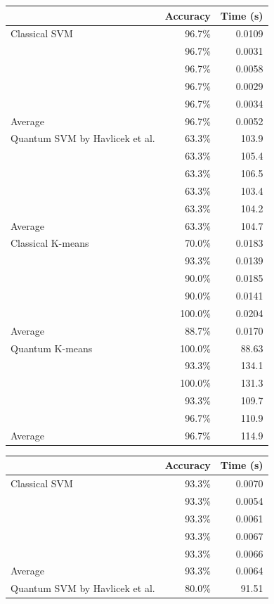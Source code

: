 \documentclass[twocolumn, english]{revtex4-2}
\begin{document}
\begin{table}
\begin{tabular}{l|r|r}
&Accuracy&Time (s)\\
\hline
Classical SVM&96.7\%&0.0109\\
\cline{2-3}
&96.7\%&0.0031\\
\cline{2-3}
&96.7\%&0.0058\\
\cline{2-3}
&96.7\%&0.0029\\
\cline{2-3}
&96.7\%&0.0034\\
\hline\hline
Average&96.7\%&0.0052\\
\hline\hline
Quantum SVM by Havlicek et al.&63.3\%&103.9\\
\cline{2-3}
&63.3\%&105.4\\
\cline{2-3}
&63.3\%&106.5\\
\cline{2-3}
&63.3\%&103.4\\
\cline{2-3}
&63.3\%&104.2\\
\hline\hline
Average&63.3\%&104.7\\
\hline\hline
Classical K-means&70.0\%&0.0183\\
\cline{2-3}
&93.3\%&0.0139\\
\cline{2-3}
&90.0\%&0.0185\\
\cline{2-3}
&90.0\%&0.0141\\
\cline{2-3}
&100.0\%&0.0204\\
\hline\hline
Average&88.7\%&0.0170\\
\hline\hline
Quantum K-means&100.0\%&88.63\\
\cline{2-3}
&93.3\%&134.1\\
\cline{2-3}
&100.0\%&131.3\\
\cline{2-3}
&93.3\%&109.7\\
\cline{2-3}
&96.7\%&110.9\\
\hline\hline
Average&96.7\%&114.9\\
\hline\hline
\end{tabular}
\begin{tabular}{|l|r|r}
&Accuracy&Time (s)\\
\hline
Classical SVM&93.3\%&0.0070\\
\cline{2-3}
&93.3\%&0.0054\\
\cline{2-3}
&93.3\%&0.0061\\
\cline{2-3}
&93.3\%&0.0067\\
\cline{2-3}
&93.3\%&0.0066\\
\hline\hline
Average&93.3\%&0.0064\\
\hline\hline
Quantum SVM by Havlicek et al.&80.0\%&91.51\\

\end{tabular}
\end{table}
\end{document}
